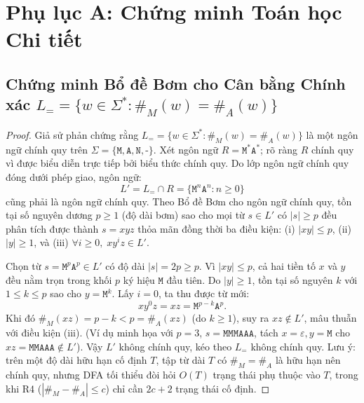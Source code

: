 \section{Phụ lục A: Chứng minh Toán học Chi tiết}

\subsection{Chứng minh Bổ đề Bơm cho Cân bằng Chính xác \texorpdfstring{$L_= = \{w \in \Sigma^* : \#_M(w) = \#_A(w)\}$}{L= = \{w in Sigma* : \#M(w) = \#A(w)\}}}
\label{app:pumping}
\begin{proof}
Giả sử phản chứng rằng $L_= = \{w \in \Sigma^* : \#_M(w) = \#_A(w)\}$ là một ngôn ngữ chính quy trên $\Sigma = \{\texttt{M}, \texttt{A}, \texttt{N}, \texttt{-}\}$. Xét ngôn ngữ $R = \texttt{M}^*\texttt{A}^*$; rõ ràng $R$ chính quy vì được biểu diễn trực tiếp bởi biểu thức chính quy. Do lớp ngôn ngữ chính quy đóng dưới phép giao, ngôn ngữ:
\begin{equation*}
    L' = L_= \cap R = \{\texttt{M}^n \texttt{A}^n : n \ge 0\}
\end{equation*}
cũng phải là ngôn ngữ chính quy. Theo Bổ đề Bơm cho ngôn ngữ chính quy, tồn tại số nguyên dương $p \ge 1$ (độ dài bơm) sao cho mọi từ $s \in L'$ có $|s| \ge p$ đều phân tích được thành $s = xyz$ thỏa mãn đồng thời ba điều kiện: (i) $|xy| \le p$, (ii) $|y| \ge 1$, và (iii) $\forall i \ge 0, \; xy^i z \in L'$.

Chọn từ $s = \texttt{M}^p \texttt{A}^p \in L'$ có độ dài $|s| = 2p \ge p$. Vì $|xy| \le p$, cả hai tiền tố $x$ và $y$ đều nằm trọn trong khối $p$ ký hiệu $\texttt{M}$ đầu tiên. Do $|y| \ge 1$, tồn tại số nguyên $k$ với $1 \le k \le p$ sao cho $y = \texttt{M}^k$. Lấy $i = 0$, ta thu được từ mới:
\begin{equation*}
    x y^0 z = xz = \texttt{M}^{p-k} \texttt{A}^p.
\end{equation*}
Khi đó $\#_M(xz) = p - k < p = \#_A(xz)$ (do $k \ge 1$), suy ra $xz \notin L'$, mâu thuẫn với điều kiện (iii). (Ví dụ minh họa với $p = 3$, $s = \texttt{MMMAAA}$, tách $x=\varepsilon, y=\texttt{M}$ cho $xz = \texttt{MMAAA} \notin L'$). Vậy $L'$ không chính quy, kéo theo $L_=$ không chính quy. Lưu ý: trên một độ dài hữu hạn cố định $T$, tập từ dài $T$ có $\#_M = \#_A$ là hữu hạn nên chính quy, nhưng DFA tối thiểu đòi hỏi $O(T)$ trạng thái phụ thuộc vào $T$, trong khi R4 ($|\#_M - \#_A| \le c$) chỉ cần $2c+2$ trạng thái cố định.
\end{proof}

